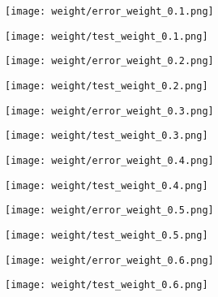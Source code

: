 \documentclass{article}
\begin{document}
\newpage
\begin{figure}[!htb]
  \centering
  \texttt{[image: weight/error\_weight\_0.1.png]}
\end{figure}

\begin{figure}[!htb]
  \centering
  \texttt{[image: weight/test\_weight\_0.1.png]}
\end{figure}

\begin{figure}[]
  \centering
  \texttt{[image: weight/error\_weight\_0.2.png]}
\end{figure}

\begin{figure}[]
  \centering
  \texttt{[image: weight/test\_weight\_0.2.png]}
\end{figure}

\begin{figure}[]
  \centering
  \texttt{[image: weight/error\_weight\_0.3.png]}
\end{figure}

\begin{figure}[]
  \centering
  \texttt{[image: weight/test\_weight\_0.3.png]}
\end{figure}

\begin{figure}[]
  \centering
  \texttt{[image: weight/error\_weight\_0.4.png]}
\end{figure}

\begin{figure}[]
  \centering
  \texttt{[image: weight/test\_weight\_0.4.png]}
\end{figure}

\begin{figure}[]
  \centering
  \texttt{[image: weight/error\_weight\_0.5.png]}
\end{figure}

\begin{figure}[]
  \centering
  \texttt{[image: weight/test\_weight\_0.5.png]}
\end{figure}

\begin{figure}[]
  \centering
  \texttt{[image: weight/error\_weight\_0.6.png]}
\end{figure}

\begin{figure}[]
  \centering
  \texttt{[image: weight/test\_weight\_0.6.png]}
\end{figure}
\end{document}
